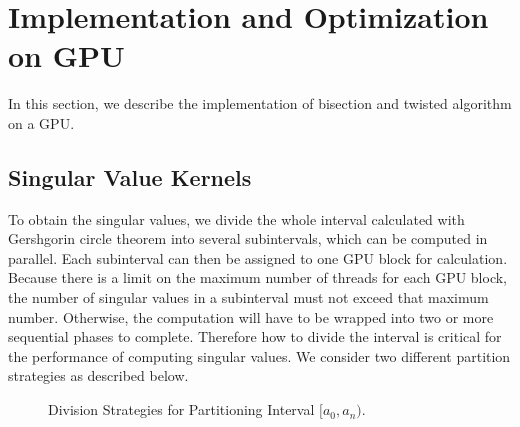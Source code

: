\section{Implementation and Optimization on GPU}
\label{sec:implementation}
In this section, we describe the implementation of bisection and twisted algorithm on a GPU.


\subsection{Singular Value Kernels}
\label{sec_svalue}
To obtain the singular values, we divide the whole interval calculated with Gershgorin circle theorem into several subintervals, which can be computed in parallel.
Each subinterval can then be assigned to one GPU block for calculation.
Because there is a limit on the maximum number of threads for each GPU block,
the number of singular values in a subinterval must not exceed that maximum number. Otherwise, the computation will have to be wrapped into two or more sequential phases to complete.
Therefore how to divide the interval is critical for the performance of
computing singular values. We consider two different partition
strategies as described below. 
\begin{figure}[hbpt]
\vspace{-0.3in}
\centering
  \vspace{-0.1in}
  \caption{Division Strategies for Partitioning Interval  $[a_0, a_n)$.}
\vspace{-0.3in}
\end{figure}

